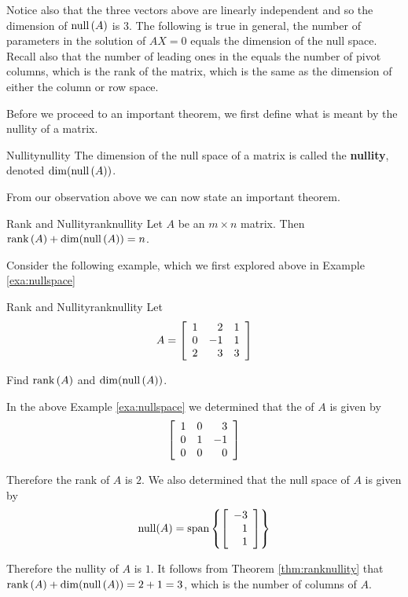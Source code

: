 Notice also that the three vectors above are linearly independent and
so the dimension of $\mbox{null} \left( A\right) $ is 3. The following is
true in general, the number of parameters in the solution of $AX=0$
equals the dimension of the null space. Recall also that the number of
leading ones in the {\rref} equals the number of pivot columns, which is
the rank of the matrix, which is the same as the dimension of either
the column or row space.

Before we proceed to an important theorem, we first define what is meant by the nullity of a matrix. 

\begin{definition}{Nullity}{nullity}
The dimension of the null space of a matrix is called the \textbf{nullity}, denoted $\dim( \mbox{null}\left(A\right))$.
\end{definition}

From our observation above we can now state an important theorem.

\begin{theorem}{Rank and Nullity}{ranknullity}
Let $A$ be an $m\times n$ matrix. Then $\mbox{rank}\left( A\right) + \dim( \mbox{null}\left(A\right)) =n$. 
\end{theorem}

Consider the following example, which we first explored above in Example \ref{exa:nullspace}

\begin{example}{Rank and Nullity}{ranknullity}
Let
\begin{equation*}
A=\left[
\begin{array}{rrr}
1 & 2 & 1 \\
0 & -1 & 1 \\
2 & 3 & 3
\end{array}
\right] 
\end{equation*}

Find $\mbox{rank}\left( A\right)$ and $\dim( \mbox{null}\left(A\right))$. 
\end{example}

\medskip
\begin{solution}
In the above Example \ref{exa:nullspace} we determined that the {\rref} of $A$ is given by 
\[
\left[ 
\begin{array}{rrr}
1 & 0 & 3 \\ 
0 & 1 & -1  \\
0 & 0 & 0 
\end{array}
\right]
\]

Therefore the rank of $A$ is $2$. We also determined that the null space of $A$ is given by 
\[
\mbox{null} (A) = \mbox{span} \left\{ \left[ 
\begin{array}{r}
-3 \\ 
1 \\ 
1
\end{array}
\right]
\right\}
\]

Therefore the nullity of $A$ is $1$. It follows from Theorem \ref{thm:ranknullity} that $\mbox{rank}\left( A\right) + \dim( \mbox{null}\left(A\right)) = 2 + 1 = 3$, which is the number of columns of $A$.
\end{solution} 

